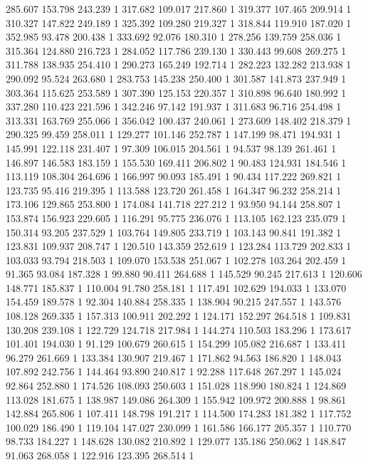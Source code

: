 	285.607	153.798	243.239	1
	317.682	109.017	217.860	1
	319.377	107.465	209.914	1
	310.327	147.822	249.189	1
	325.392	109.280	219.327	1
	318.844	119.910	187.020	1
	352.985	93.478	200.438	1
	333.692	92.076	180.310	1
	278.256	139.759	258.036	1
	315.364	124.880	216.723	1
	284.052	117.786	239.130	1
	330.443	99.608	269.275	1
	311.788	138.935	254.410	1
	290.273	165.249	192.714	1
	282.223	132.282	213.938	1
	290.092	95.524	263.680	1
	283.753	145.238	250.400	1
	301.587	141.873	237.949	1
	303.364	115.625	253.589	1
	307.390	125.153	220.357	1
	310.898	96.640	180.992	1
	337.280	110.423	221.596	1
	342.246	97.142	191.937	1
	311.683	96.716	254.498	1
	313.331	163.769	255.066	1
	356.042	100.437	240.061	1
	273.609	148.402	218.379	1
	290.325	99.459	258.011	1
	129.277	101.146	252.787	1
	147.199	98.471	194.931	1
	145.991	122.118	231.407	1
	97.309	106.015	204.561	1
	94.537	98.139	261.461	1
	146.897	146.583	183.159	1
	155.530	169.411	206.802	1
	90.483	124.931	184.546	1
	113.119	108.304	264.696	1
	166.997	90.093	185.491	1
	90.434	117.222	269.821	1
	123.735	95.416	219.395	1
	113.588	123.720	261.458	1
	164.347	96.232	258.214	1
	173.106	129.865	253.800	1
	174.084	141.718	227.212	1
	93.950	94.144	258.807	1
	153.874	156.923	229.605	1
	116.291	95.775	236.076	1
	113.105	162.123	235.079	1
	150.314	93.205	237.529	1
	103.764	149.805	233.719	1
	103.143	90.841	191.382	1
	123.831	109.937	208.747	1
	120.510	143.359	252.619	1
	123.284	113.729	202.833	1
	103.033	93.794	218.503	1
	109.070	153.538	251.067	1
	102.278	103.264	202.459	1
	91.365	93.084	187.328	1
	99.880	90.411	264.688	1
	145.529	90.245	217.613	1
	120.606	148.771	185.837	1
	110.004	91.780	258.181	1
	117.491	102.629	194.033	1
	133.070	154.459	189.578	1
	92.304	140.884	258.335	1
	138.904	90.215	247.557	1
	143.576	108.128	269.335	1
	157.313	100.911	202.292	1
	124.171	152.297	264.518	1
	109.831	130.208	239.108	1
	122.729	124.718	217.984	1
	144.274	110.503	183.296	1
	173.617	101.401	194.030	1
	91.129	100.679	260.615	1
	154.299	105.082	216.687	1
	133.411	96.279	261.669	1
	133.384	130.907	219.467	1
	171.862	94.563	186.820	1
	148.043	107.892	242.756	1
	144.464	93.890	240.817	1
	92.288	117.648	267.297	1
	145.024	92.864	252.880	1
	174.526	108.093	250.603	1
	151.028	118.990	180.824	1
	124.869	113.028	181.675	1
	138.987	149.086	264.309	1
	155.942	109.972	200.888	1
	98.861	142.884	265.806	1
	107.411	148.798	191.217	1
	114.500	174.283	181.382	1
	117.752	100.029	186.490	1
	119.104	147.027	230.099	1
	161.586	166.177	205.357	1
	110.770	98.733	184.227	1
	148.628	130.082	210.892	1
	129.077	135.186	250.062	1
	148.847	91.063	268.058	1
	122.916	123.395	268.514	1
